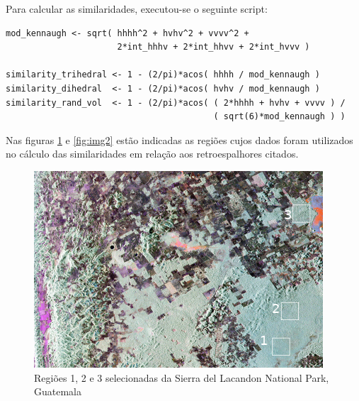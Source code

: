\documentclass[12pt]{article}
\begin{document}
Para calcular as similaridades, executou-se o seguinte script:
\begin{verbatim}
mod_kennaugh <- sqrt( hhhh^2 + hvhv^2 + vvvv^2 + 
                      2*int_hhhv + 2*int_hhvv + 2*int_hvvv )

similarity_trihedral <- 1 - (2/pi)*acos( hhhh / mod_kennaugh )
similarity_dihedral  <- 1 - (2/pi)*acos( hvhv / mod_kennaugh )
similarity_rand_vol  <- 1 - (2/pi)*acos( ( 2*hhhh + hvhv + vvvv ) / 
                                         ( sqrt(6)*mod_kennaugh ) ) 
\end{verbatim}

Nas figuras \ref{fig:img1} e \ref{fig:img2} estão indicadas as regiões cujos dados foram utilizados no cálculo das similaridades em relação aos retroespalhores citados.

\begin{figure}[!h]
    \centering
    \includegraphics[width = 0.9\linewidth]{../../Images/Report_18_12_17/guatemala2.png}
    \caption{Regiões 1, 2 e 3 selecionadas da Sierra del Lacandon National Park, Guatemala}
    \label{fig:img1}
\end{figure}
\end{document}
